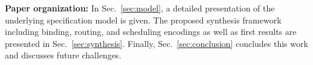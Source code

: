 \textbf{Paper organization: } 
In Sec.~\ref{sec:model}, a detailed presentation of the underlying specification model is given. 
The proposed synthesis framework including binding, routing, and scheduling encodings as well as first results are presented in Sec.~\ref{sec:synthesis}. 
Finally, Sec.~\ref{sec:conclusion} concludes this work and discusses future challenges. 

